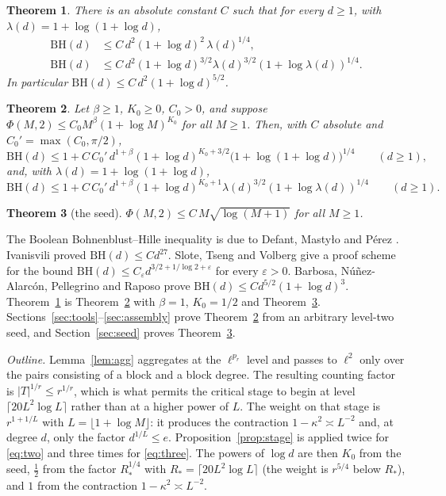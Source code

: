 \documentclass[11pt]{amsart}
\newtheorem{theorem}{Theorem}[section]
\theoremstyle{definition}
\newcommand{\BH}{\mathrm{BH}}
\begin{document}
\begin{theorem}\label{thm:main}
There is an absolute constant $C$ such that for every $d\ge1$, with $\lambda(d)=1+\log(1+\log d)$,
\begin{align}
\BH(d)&\le C\,d^{2}(1+\log d)^{2}\,\lambda(d)^{1/4},\label{eq:two}\\
\BH(d)&\le C\,d^{2}(1+\log d)^{3/2}\lambda(d)^{3/2}(1+\log\lambda(d))^{1/4}.\label{eq:three}
\end{align}
In particular $\BH(d)\le C\,d^2(1+\log d)^{5/2}$.
\end{theorem}

\begin{theorem}\label{thm:cond}
Let $\beta\ge1$, $K_0\ge0$, $C_0>0$, and suppose $\Phi(M,2)\le C_0M^\beta(1+\log M)^{K_0}$ for all $M\ge1$. Then, with $C$ absolute and $C_0'=\max(C_0,\pi/2)$,
\[
\BH(d)\le1+C\,C_0'\,d^{1+\beta}(1+\log d)^{K_0+3/2}\big(1+\log(1+\log d)\big)^{1/4}\qquad(d\ge1),
\]
and, with $\lambda(d)=1+\log(1+\log d)$,
\[
\BH(d)\le1+C\,C_0'\,d^{1+\beta}(1+\log d)^{K_0+1}\lambda(d)^{3/2}(1+\log\lambda(d))^{1/4}\qquad(d\ge1).
\]
\end{theorem}

\begin{theorem}[the seed]\label{thm:seed}
$\Phi(M,2)\le C\,M\sqrt{\log(M+1)}$ for all $M\ge1$.
\end{theorem}

The Boolean Bohnenblust--Hille inequality is due to Defant, Mastyło and P\'erez \cite{DMP}. Ivanisvili \cite[Theorem~1.1]{I27} proved $\BH(d)\le Cd^{27}$. Slote, Tseng and Volberg \cite{STV} give a proof scheme for the bound $\BH(d)\le C_\varepsilon d^{3/2+1/\log 2+\varepsilon}$ for every $\varepsilon>0$. Barbosa, N\'u\~nez-Alarc\'on, Pellegrino and Raposo \cite{BNPR} prove $\BH(d)\le Cd^{5/2}(1+\log d)^3$. Theorem~\ref{thm:main} is Theorem~\ref{thm:cond} with $\beta=1$, $K_0=1/2$ and Theorem~\ref{thm:seed}. Sections~\ref{sec:tools}--\ref{sec:assembly} prove Theorem~\ref{thm:cond} from an arbitrary level-two seed, and Section~\ref{sec:seed} proves Theorem~\ref{thm:seed}.

\smallskip\noindent\emph{Outline.} Lemma~\ref{lem:agg} aggregates at the $\ell^{p_r}$ level and passes to $\ell^2$ only over the pairs consisting of a block and a block degree. The resulting counting factor is $|T|^{1/r}\le r^{1/r}$, which is what permits the critical stage to begin at level $\lceil20L^2\log L\rceil$ rather than at a higher power of $L$. The weight on that stage is $r^{1+1/L}$ with $L=\lfloor1+\log M\rfloor$: it produces the contraction $1-\kappa^2\asymp L^{-2}$ and, at degree $d$, only the factor $d^{1/L}\le e$. Proposition~\ref{prop:stage} is applied twice for \eqref{eq:two} and three times for \eqref{eq:three}. The powers of $\log d$ are then $K_0$ from the seed, $\frac12$ from the factor $R_*^{1/4}$ with $R_*=\lceil20L^2\log L\rceil$ (the weight is $r^{5/4}$ below $R_*$), and $1$ from the contraction $1-\kappa^2\asymp L^{-2}$.
\end{document}
